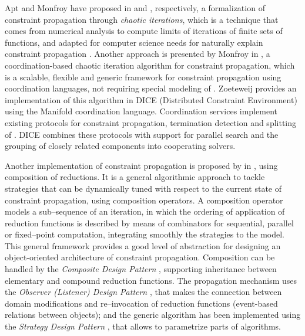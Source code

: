 Apt and Monfroy have proposed in \cite{Apt} and \cite{Monfroy}, respectively, a formalization of constraint propagation through \textit{chaotic iterations}, which is a technique that comes from numerical analysis to compute limits of iterations of finite sets of functions, and adapted for computer science needs for naturally explain constraint propagation \cite{Chazan1969, Cousot1977}. Another approach is presented by Monfroy in \cite{Monfroy2000}, a coordination-based chaotic iteration algorithm for constraint propagation, which is a scalable, flexible and generic framework for constraint propagation using coordination languages, not requiring special modeling of \csps. Zoeteweij provides an implementation of this algorithm in {\sc DICE} (Distributed Constraint Environment) \cite{Zoeteweij2003} using the {\sc Manifold} coordination language. Coordination services implement existing protocols for constraint propagation, termination detection and splitting of \csps. {\sc DICE} combines these protocols with support for parallel search and the grouping of closely related components into cooperating solvers.

Another implementation of constraint propagation is proposed by  in \cite{Granvilliers2001}, using composition of reductions. It is a general algorithmic approach to tackle strategies that can be dynamically tuned with respect to the current state of constraint propagation, using composition operators. A composition operator models a sub--sequence of an iteration, in which the ordering of application of reduction functions is described by means of combinators for sequential, parallel or fixed--point computation, integrating smoothly the strategies to the model. This general framework provides a good level of abstraction for designing an object-oriented architecture of constraint propagation. Composition can be handled by the {\it Composite Design Pattern} \cite{DP_Composite}, supporting inheritance between elementary and compound reduction functions. The propagation mechanism uses the {\it Observer (Listener) Design Pattern} \cite{DP_Observer}, that makes the connection between domain modifications and re--invocation of reduction functions (event-based relations between objects); and the generic algorithm has been implemented using the {\it Strategy Design Pattern} \cite{DP_Strategy}, that allows to parametrize parts of algorithms.

